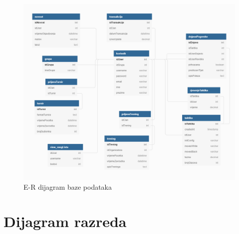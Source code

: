 			\begin{figure}[H]
					\centerfloat
        					\includegraphics[scale=0.60]{dijagrami/dijagramBaze.png} %
        					\caption{E-R dijagram baze podataka}
        					\label{fig:DBdiagram}
				\end{figure}
			
			\eject
			
			
		\section{Dijagram razreda}


